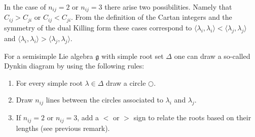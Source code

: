     \begin{remark}
        In the case of $n_{ij} = 2$ or $n_{ij} = 3$ there arise two possibilities. Namely that $C_{ij}>C_{ji}$ or $C_{ij}<C_{ji}$. From the definition of the Cartan integers and the symmetry of the dual Killing form these cases correspond to $\langle\lambda_i, \lambda_i\rangle<\langle\lambda_j, \lambda_j\rangle$ and $\langle\lambda_i, \lambda_i\rangle>\langle\lambda_j, \lambda_j\rangle$.
    \end{remark}

    \begin{construct}\label{lie:construct_dynkin}
        For a semisimple Lie algebra $\mathfrak{g}$ with simple root set $\Delta$ one can draw a so-called Dynkin diagram by using the following rules:
        \begin{enumerate}
            \item For every simple root $\lambda\in\Delta$ draw a circle $\bigcirc$.
            \item Draw $n_{ij}$ lines between the circles associated to $\lambda_i$ and $\lambda_j$.
            \item If $n_{ij} = 2$ or $n_{ij} = 3$, add a $<$ or $>$ sign to relate the roots based on their lengths (see previous remark).
        \end{enumerate}
    \end{construct}

